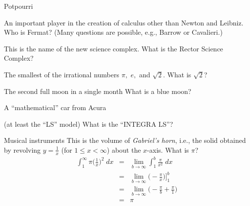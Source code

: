 \documentclass{article}
\begin{document}
\begin{category}{Potpourri}

  \begin{clue}
    An important player in the creation of calculus other than Newton and Leibniz.
  \response
    Who is Fermat? (Many questions are possible, e.g., Barrow or Cavalieri.)
  \end{clue}

  \begin{clue}
    This is the name of the new science complex.
  \response
    What is the Rector Science Complex?
  \end{clue}

  \begin{clue}
    The smallest of the irrational numbers $\pi,$ $e,$ and $\sqrt{2}.$
  \response
    What is $\sqrt{2}$?
  \end{clue}

  \begin{clue}
    The second full moon in a single month
  \response
    What is a blue moon?
  \end{clue}

  \begin{clue}
    A ``mathematical'' car from Acura

    (at least the ``LS'' model)
  \response
    What is the ``INTEGRA LS''?
  \end{clue}

\end{category}

\begin{final}{Musical instruments}
  This is the volume of \emph{Gabriel's horn}, i.e., the solid obtained by
  revolving $\displaystyle y=\frac{1}{x}$ (for $1\le x<\infty$) about the
  $x$-axis.
\response
  What is $\pi$?
\solution
  \[
  \begin{array}{rcl}
  {\displaystyle \int_{1}^{\infty}\pi\Big(\frac{1}{x}\Big)^{2}\; dx} & = & {\displaystyle \lim_{b\to \infty} \int_{1}^{b}\frac{\pi}{x^{2}}\; dx} \\
  & = & {\displaystyle \lim_{b\to \infty}\Big(-\frac{\pi}{x}\Big)\Big]_{1}^{b}}\\
  & = & {\displaystyle \lim_{b\to \infty}\Big(-\frac{\pi}{b}+\frac{\pi}{1}\Big)}\\
  & = & \pi
  \end{array}
  \]
\end{final}
\end{document}
